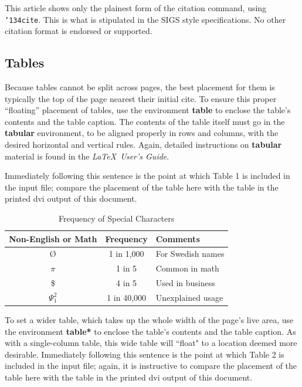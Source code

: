 \documentclass{sig-alternate}
\begin{document}
This article shows only the plainest form
of the citation command, using \texttt{{\char'134}cite}.
This is what is stipulated in the SIGS style specifications.
No other citation format is endorsed or supported.

\subsection{Tables}
Because tables cannot be split across pages, the best
placement for them is typically the top of the page
nearest their initial cite.  To
ensure this proper ``floating'' placement of tables, use the
environment \textbf{table} to enclose the table's contents and
the table caption.  The contents of the table itself must go
in the \textbf{tabular} environment, to
be aligned properly in rows and columns, with the desired
horizontal and vertical rules.  Again, detailed instructions
on \textbf{tabular} material
is found in the \textit{\LaTeX\ User's Guide}.

Immediately following this sentence is the point at which
Table 1 is included in the input file; compare the
placement of the table here with the table in the printed
dvi output of this document.

\begin{table}
\centering
\caption{Frequency of Special Characters}
\begin{tabular}{|c|c|l|} \hline
Non-English or Math&Frequency&Comments\\ \hline
\O & 1 in 1,000& For Swedish names\\ \hline
$\pi$ & 1 in 5& Common in math\\ \hline
\$ & 4 in 5 & Used in business\\ \hline
$\Psi^2_1$ & 1 in 40,000& Unexplained usage\\
\hline\end{tabular}
\end{table}

To set a wider table, which takes up the whole width of
the page's live area, use the environment
\textbf{table*} to enclose the table's contents and
the table caption.  As with a single-column table, this wide
table will ``float" to a location deemed more desirable.
Immediately following this sentence is the point at which
Table 2 is included in the input file; again, it is
instructive to compare the placement of the
table here with the table in the printed dvi
output of this document.
\end{document}
